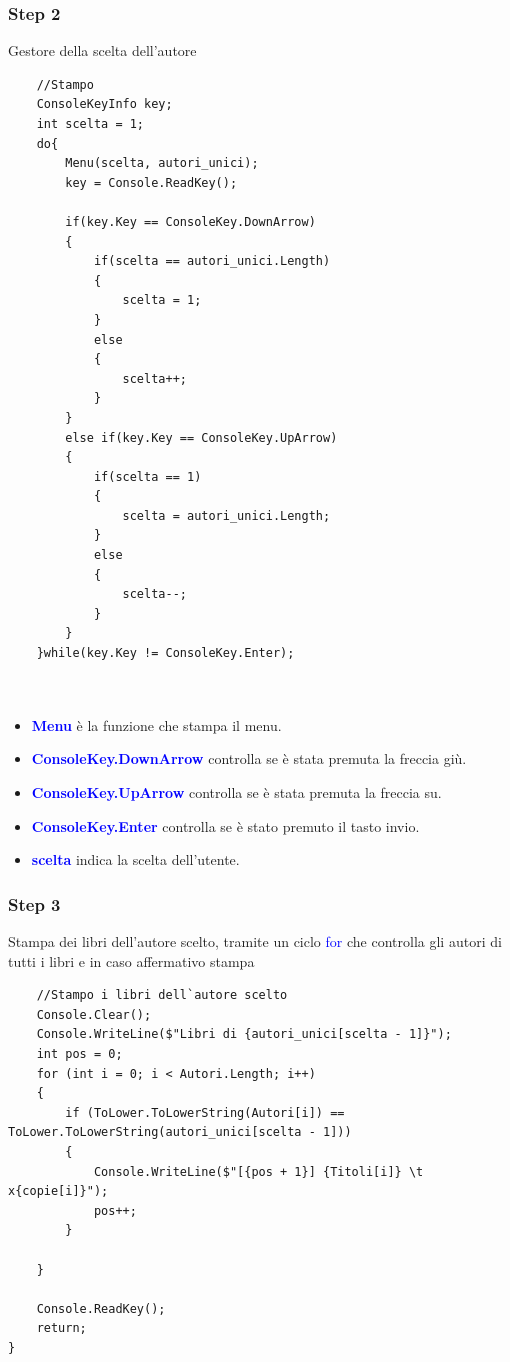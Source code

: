 \documentclass[a4paper,12pt]{article}
\begin{document}
\newpage


\subsubsection{Step 2}
Gestore della scelta dell'autore

\begin{lstlisting}
    //Stampo
    ConsoleKeyInfo key;
    int scelta = 1;
    do{
        Menu(scelta, autori_unici);
        key = Console.ReadKey();

        if(key.Key == ConsoleKey.DownArrow)
        {
            if(scelta == autori_unici.Length)
            {
                scelta = 1;
            }
            else
            {
                scelta++;
            }
        }
        else if(key.Key == ConsoleKey.UpArrow)
        {
            if(scelta == 1)
            {
                scelta = autori_unici.Length;
            }
            else
            {
                scelta--;
            }
        }
    }while(key.Key != ConsoleKey.Enter);

    
\end{lstlisting}

\begin{itemize}
    \item \textcolor{blue}{\textbf{Menu}} è la funzione che stampa il menu.
    \item \textcolor{blue}{\textbf{ConsoleKey.DownArrow}} controlla se è stata premuta la freccia giù.
    \item \textcolor{blue}{\textbf{ConsoleKey.UpArrow}} controlla se è stata premuta la freccia su.
    \item \textcolor{blue}{\textbf{ConsoleKey.Enter}} controlla se è stato premuto il tasto invio.
    \item \textcolor{blue}{\textbf{scelta}} indica la scelta dell'utente.
\end{itemize}

\subsubsection{Step 3}

Stampa dei libri dell'autore scelto, tramite un ciclo \textcolor{blue}{for} che controlla gli autori di tutti i libri e in caso affermativo stampa

\begin{lstlisting}
    //Stampo i libri dell`autore scelto
    Console.Clear();
    Console.WriteLine($"Libri di {autori_unici[scelta - 1]}");
    int pos = 0;
    for (int i = 0; i < Autori.Length; i++)
    {
        if (ToLower.ToLowerString(Autori[i]) == ToLower.ToLowerString(autori_unici[scelta - 1]))
        {
            Console.WriteLine($"[{pos + 1}] {Titoli[i]} \t x{copie[i]}");
            pos++;
        }
                
    }

    Console.ReadKey();
    return;
}
\end{lstlisting}
\end{document}
